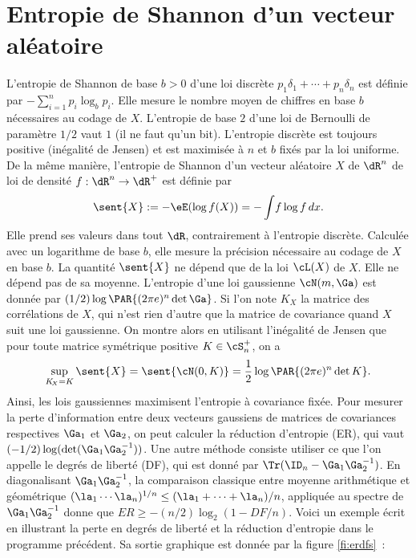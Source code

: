 {{\section{Entropie de Shannon d'un vecteur aléatoire}
%
L'entropie de Shannon de base $b>0$ d'une loi discrète $p_1\delta_1+\cdots+
p_n\delta_n$ est définie par $-\sum_{i=1}^n p_i\log_b p_i$.  Elle mesure le
nombre moyen de chiffres en base $b$ nécessaires au codage de $X$. L'entropie
de base $2$ d'une loi de Bernoulli de paramètre $1/2$ vaut $1$ (il ne faut
qu'un bit). L'entropie discrète est toujours positive (inégalité de Jensen) et
est maximisée à $n$ et $b$ fixés par la loi uniforme.  De la même manière,
l'entropie de Shannon d'un vecteur aléatoire $X$ de $\dR^n$ de loi de densité
$f:\dR^n\to\dR^+$ est définie par
$$
\sent{X}:=-\eE(\log f(X))=-\int\!f\log f\,dx.
$$
Elle prend ses valeurs dans tout $\dR$, contrairement à l'entropie
discrète.  Calculée avec un logarithme de base $b$, elle mesure la précision
nécessaire au codage de $X$ en base $b$. La quantité $\sent{X}$ ne dépend que
de la loi $\cL(X)$ de $X$. Elle ne dépend pas de sa moyenne. L'entropie d'une
loi gaussienne $\cN(m,\Ga)$ est donnée par $(1/2) \log \PAR{(2\pi e)^n\det
  \Ga}$.  Si l'on note $K_{\!X}$ la matrice des corrélations de $X$, qui n'est
rien d'autre que la matrice de covariance quand $X$ suit une loi gaussienne.
On montre alors en utilisant l'inégalité de Jensen que pour toute matrice
symétrique positive $K\in\cS_n^+$, on a
$$
\sup_{K_{\!X}=K}\sent{X} = \sent{\cN(0,K)} = \frac{1}{2} \log \PAR{(2\pi
  e)^n\det K}.
$$
Ainsi, les lois gaussiennes maximisent l'entropie à covariance fixée. Pour
mesurer la perte d'information entre deux vecteurs gaussiens de matrices de
covariances respectives $\Ga_1$ et $\Ga_2$, on peut calculer la réduction
d'entropie (ER), qui vaut $(-1/2)\log(\det(\Ga_1\Ga_2^{-1}))$. Une autre
méthode consiste utiliser ce que l'on appelle le degrés de liberté (DF), qui
est donné par $\Tr(\ID_n-\Ga_1\Ga_2^{-1})$. En diagonalisant
$\Ga_1\Ga_2^{-1}$, la comparaison classique entre moyenne arithmétique et
géométrique $(\la_1\cdots\la_n)^{1/n} \leq (\la_1+\cdots+\la_n)/n$, appliquée au spectre de
$\Ga_1\Ga_2^{-1}$ donne que $ER\geq -(n/2)\log_2(1-DF/n)$. Voici un exemple écrit
en \ML{} illustrant la perte en degrés de liberté et la réduction d'entropie
dans le programme précédent. Sa sortie graphique est donnée par la figure
\ref{fi:erdfs}~:
%
%
%
%

}}
